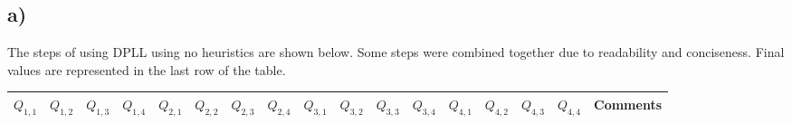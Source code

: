 \documentclass[22pt]{article}
\begin{document}
\subsection*{a)}
The steps of using DPLL using no heuristics are shown below. Some 
steps were combined together due to readability and conciseness.
Final values are represented in the last row of the table.

\begin{table}[htbp]
\centering
\small
\setlength\tabcolsep{3pt}
\begin{tabular}{ |c|c|c|c|c|c|c|c|c|c|c|c|c|c|c|c|c| } 
 \hline
 $Q_{1,1}$ & $Q_{1,2}$ & $Q_{1,3}$ & $Q_{1,4}$ & $Q_{2,1}$ & $Q_{2,2}$ & $Q_{2,3}$ & $Q_{2,4}$ & $Q_{3,1}$ &
  $Q_{3,2}$ & $Q_{3,3}$ & $Q_{3,4}$ & $Q_{4,1}$ & $Q_{4,2}$ & $Q_{4,3}$ & $Q_{4,4}$ & Comments\\ \hline


\end{tabular}
\end{table}
\end{document}
